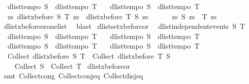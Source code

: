 \begin{isabellebody}
\ \ dlist{\isacharunderscore}tempo{}\ S\ {\isasymLongrightarrow}\ dlist{\isacharunderscore}tempo{}\ T\ {\isasymLongrightarrow}\isanewline
\ \ dlist{\isacharunderscore}tempo{}\ S\ {\isasymLongrightarrow}\ dlist{\isacharunderscore}tempo{}\ T\ {\isasymLongrightarrow}\isanewline
\ \ {\isacharparenleft}{\isasymlambda}zs{\isachardot}\ {\isacharparenleft}dlist{\isacharunderscore}xbefore\ S\ T\ zs{\isacharparenright}\ {\isasymor}\ {\isacharparenleft}dlist{\isacharunderscore}xbefore\ T\ S\ zs{\isacharparenright}{\isacharparenright}\ {\isacharequal}\ \isanewline
\ \ \ \ {\isacharparenleft}{\isasymlambda}zs{\isachardot}\ S\ zs\ {\isasymand}\ T\ zs{\isacharparenright}{\isachardoublequoteclose}\isanewline
%
\isadelimproof
%
\endisadelimproof
%
\isatagproof
{}\isamarkupfalse%
\ dlist{\isacharunderscore}xbefore{\isacharunderscore}or{\isacharunderscore}one{\isacharunderscore}list\ \isanewline
{}\isamarkupfalse%
\ blast%
\endisatagproof
{\isafoldproof}%
%
\isadelimproof
\isanewline
%
\endisadelimproof
\isanewline
{}\isamarkupfalse%
\ dlistset{\isacharunderscore}xbefore{\isacharunderscore}or{\isacharcolon}\isanewline
\ \ {\isachardoublequoteopen}dlist{\isacharunderscore}independent{\isacharunderscore}events\ S\ T\ {\isasymLongrightarrow}\ \isanewline
\ \ dlist{\isacharunderscore}tempo{}\ S\ {\isasymLongrightarrow}\ dlist{\isacharunderscore}tempo{}\ T\ {\isasymLongrightarrow}\isanewline
\ \ dlist{\isacharunderscore}tempo{}\ S\ {\isasymLongrightarrow}\ dlist{\isacharunderscore}tempo{}\ T\ {\isasymLongrightarrow}\isanewline
\ \ dlist{\isacharunderscore}tempo{}\ S\ {\isasymLongrightarrow}\ dlist{\isacharunderscore}tempo{}\ T\ {\isasymLongrightarrow}\isanewline
\ \ dlist{\isacharunderscore}tempo{}\ S\ {\isasymLongrightarrow}\ dlist{\isacharunderscore}tempo{}\ T\ {\isasymLongrightarrow}\isanewline
\ \ {\isacharparenleft}Collect\ {\isacharparenleft}dlist{\isacharunderscore}xbefore\ S\ T{\isacharparenright}{\isacharparenright}\ {\isasymunion}\ {\isacharparenleft}Collect\ {\isacharparenleft}dlist{\isacharunderscore}xbefore\ T\ S{\isacharparenright}{\isacharparenright}\ {\isacharequal}\ \isanewline
\ \ \ \ Collect\ S\ {\isasyminter}\ Collect\ T{\isachardoublequoteclose}\isanewline
%
\isadelimproof
%
\endisadelimproof
%
\isatagproof
{}\isamarkupfalse%
\ dlist{\isacharunderscore}xbefore{\isacharunderscore}or\isanewline
{}\isamarkupfalse%
\ {\isacharparenleft}smt\ Collect{\isacharunderscore}cong\ Collect{\isacharunderscore}conj{\isacharunderscore}eq\ Collect{\isacharunderscore}disj{\isacharunderscore}eq{\isacharparenright}%

\end{isabellebody}
